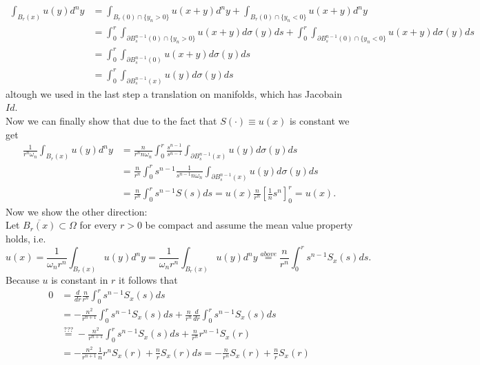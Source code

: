 \documentclass[A4,12pt,twoside]{book}
\begin{document}
{        \begin{align*}
            \int_{B_r (x)} u(y) d^n y &=  \int_{B_r (0) \cap \{ y_n >0 \}} u(x+y) d^n y + \int_{B_r (0) \cap \{ y_n <0 \}} u(x+y) d^n y \\
            &= \int_0^r \int_{\partial B_s^{n-1} (0)\cap \{ y_n >0 \} } u(x+y) d \sigma (y) ds + \int_0^r \int_{\partial B_s^{n-1} (0)\cap \{ y_n <0 \} } u(x+y) d \sigma (y) ds \\
            &= \int_0^r \int_{\partial B_s^{n-1} (0) } u(x+y) d \sigma (y) ds \\
            &= \int_0^r \int_{\partial B_s^{n-1} (x) } u(y) d \sigma (y) ds 
        \end{align*}
        altough we used in the last step a translation on manifolds, which has Jacobain $Id$. \\
        Now we can finally show that due to the fact that $S(\cdot)\equiv u(x)$ is constant we get
        \begin{align*}
            \frac{1}{r^n \omega_n} \int_{B_r (x)} u (y ) d^n y &= \frac{n}{r^n n \omega_n} \int_0^r \frac{s^{n-1}}{s^{n-1}} \int_{\partial B_s^{n-1} (x) } u(y) d \sigma (y) ds \\
            &= \frac{n}{r^n } \int_0^r s^{n-1} \frac{1}{s^{n-1} n \omega_n} \int_{\partial B_s^{n-1} (x) } u(y) d \sigma (y) ds \\
            &= \frac{n}{r^n } \int_0^r s^{n-1} S(s) ds = u(x) \frac{n}{r^n } [\frac{1}{n} s^n]_0^r = u(x).
        \end{align*}       
        Now we show the other direction: \\
        Let $\overline{B_r (x)} \subset \Omega$ for every $r>0$ be compact and assume the mean value property holds, i.e.
        \[
        u(x) = \frac{1}{\omega_n r^n} \int_{B_r (x)} u(y) d^n y = \frac{1}{\omega_n r^n} \int_{B_r (x)} u(y) d^n y \stackrel{above}{=} \frac{n}{r^n} \int_0^r s^{n-1} S_x (s) ds.
        \]
        Because $u$ is constant in $r$ it follows that 
        \begin{align*}
        0&= \frac{d}{dr} \frac{n}{r^n} \int_0^r s^{n-1} S_x (s) ds  \\
        &= -\frac{n^2}{r^{n+1}} \int_0^r s^{n-1} S_x (s) ds + \frac{n}{r^n} \frac{d}{dr}   \int_0^r s^{n-1} S_x (s) ds \\
        &\stackrel{???}{=} -\frac{n^2}{r^{n+1}} \int_0^r s^{n-1} S_x (s) ds + \frac{n}{r^n} r^{n-1}  S_x (r)  \\
        &= -\frac{n^2}{r^{n+1}} \frac{1}{n} r^{n} S_x (r)  + \frac{n}{r}  S_x (r) ds = -\frac{n}{r^{n}} S_x (r)  + \frac{n}{r}  S_x (r)  \\

\end{align*}}
\end{document}
